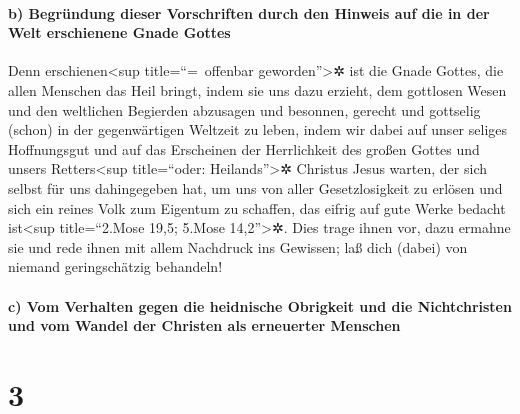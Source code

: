 \hypertarget{b-begruxfcndung-dieser-vorschriften-durch-den-hinweis-auf-die-in-der-welt-erschienene-gnade-gottes}{%
\paragraph{b) Begründung dieser Vorschriften durch den Hinweis auf die
in der Welt erschienene Gnade
Gottes}\label{b-begruxfcndung-dieser-vorschriften-durch-den-hinweis-auf-die-in-der-welt-erschienene-gnade-gottes}}

 Denn erschienen\textless sup title=``=~offenbar
geworden''\textgreater✲ ist die Gnade Gottes, die allen Menschen das
Heil bringt,  indem sie uns dazu erzieht, dem gottlosen
Wesen und den weltlichen Begierden abzusagen und besonnen, gerecht und
gottselig (schon) in der gegenwärtigen Weltzeit zu leben,
 indem wir dabei auf unser seliges Hoffnungsgut und auf
das Erscheinen der Herrlichkeit des großen Gottes und unsers
Retters\textless sup title=``oder: Heilands''\textgreater✲ Christus
Jesus warten,  der sich selbst für uns dahingegeben hat,
um uns von aller Gesetzlosigkeit zu erlösen und sich ein reines Volk zum
Eigentum zu schaffen, das eifrig auf gute Werke bedacht ist\textless sup
title=``2.Mose 19,5; 5.Mose 14,2''\textgreater✲.  Dies
trage ihnen vor, dazu ermahne sie und rede ihnen mit allem Nachdruck ins
Gewissen; laß dich (dabei) von niemand geringschätzig behandeln!

\hypertarget{c-vom-verhalten-gegen-die-heidnische-obrigkeit-und-die-nichtchristen-und-vom-wandel-der-christen-als-erneuerter-menschen}{%
\paragraph{c) Vom Verhalten gegen die heidnische Obrigkeit und die
Nichtchristen und vom Wandel der Christen als erneuerter
Menschen}\label{c-vom-verhalten-gegen-die-heidnische-obrigkeit-und-die-nichtchristen-und-vom-wandel-der-christen-als-erneuerter-menschen}}

\hypertarget{section-2}{%
\section{3}\label{section-2}}

